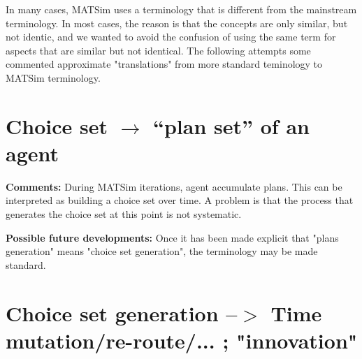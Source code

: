 \documentclass[a4paper,11pt]{report}
\begin{document}
In  many cases, MATSim uses a terminology that is different from the  mainstream terminology. In most cases, the reason is that the  concepts are only similar, but not identic, and we wanted to avoid the  confusion of using the same term for aspects that are similar but not  identical. The following attempts some commented approximate  "translations" from more standard teminology to MATSim terminology.

\vfill\eject
\section{Choice set $\to$ ``plan set'' of an agent}



\textbf{Comments:} During MATSim iterations, agent accumulate   plans. This can be  interpreted as building a choice set over  time. A  problem is that the  process that generates the choice  set at this  point is not systematic.

\textbf{Possible future developments:} Once it has been made explicit that "plans generation" means "choice set generation", the terminology may be made standard.

\vfill\eject
\section{Choice set generation --$>$ Time mutation/re-route/... ; "innovation"}


\end{document}
